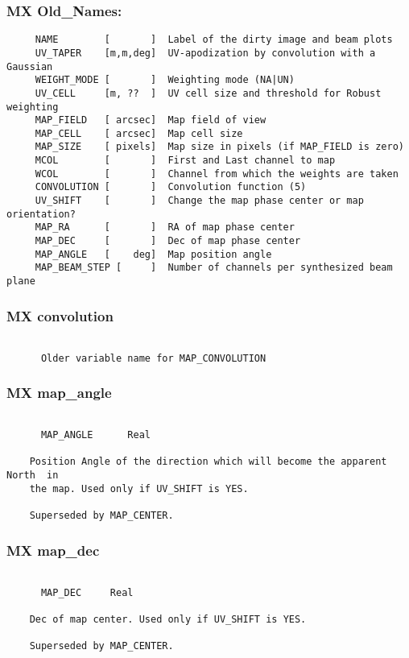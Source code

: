 \subsubsection{MX Old\_Names:}
\begin{verbatim}
     NAME        [       ]  Label of the dirty image and beam plots
     UV_TAPER    [m,m,deg]  UV-apodization by convolution with a Gaussian
     WEIGHT_MODE [       ]  Weighting mode (NA|UN)
     UV_CELL     [m, ??  ]  UV cell size and threshold for Robust weighting
     MAP_FIELD   [ arcsec]  Map field of view
     MAP_CELL    [ arcsec]  Map cell size
     MAP_SIZE    [ pixels]  Map size in pixels (if MAP_FIELD is zero)
     MCOL        [       ]  First and Last channel to map
     WCOL        [       ]  Channel from which the weights are taken
     CONVOLUTION [       ]  Convolution function (5)
     UV_SHIFT    [       ]  Change the map phase center or map orientation?
     MAP_RA      [       ]  RA of map phase center
     MAP_DEC     [       ]  Dec of map phase center
     MAP_ANGLE   [    deg]  Map position angle
     MAP_BEAM_STEP [     ]  Number of channels per synthesized beam plane

\end{verbatim}
\subsubsection{MX convolution}
\begin{verbatim}

      Older variable name for MAP_CONVOLUTION

\end{verbatim}
\subsubsection{MX map\_angle}
\begin{verbatim}

      MAP_ANGLE      Real

    Position Angle of the direction which will become the apparent North  in
    the map. Used only if UV_SHIFT is YES.

    Superseded by MAP_CENTER.

\end{verbatim}
\subsubsection{MX map\_dec}
\begin{verbatim}

      MAP_DEC     Real

    Dec of map center. Used only if UV_SHIFT is YES.

    Superseded by MAP_CENTER.

\end{verbatim}
